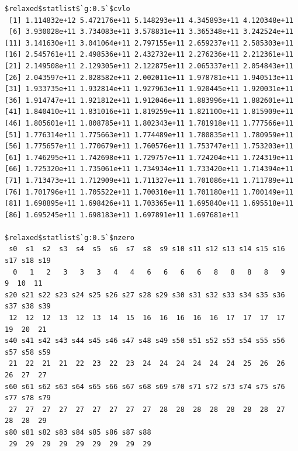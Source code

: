 \documentclass[
]{article}
\begin{document}
\begin{verbatim}
$relaxed$statlist$`g:0.5`$cvlo
 [1] 1.114832e+12 5.472176e+11 5.148293e+11 4.345893e+11 4.120348e+11
 [6] 3.930028e+11 3.734083e+11 3.578831e+11 3.365348e+11 3.242524e+11
[11] 3.141630e+11 3.041064e+11 2.797155e+11 2.659237e+11 2.585303e+11
[16] 2.545761e+11 2.498536e+11 2.432732e+11 2.276236e+11 2.212361e+11
[21] 2.149508e+11 2.129305e+11 2.122875e+11 2.065337e+11 2.054843e+11
[26] 2.043597e+11 2.028582e+11 2.002011e+11 1.978781e+11 1.940513e+11
[31] 1.933735e+11 1.932814e+11 1.927963e+11 1.920445e+11 1.920031e+11
[36] 1.914747e+11 1.921812e+11 1.912046e+11 1.883996e+11 1.882601e+11
[41] 1.840410e+11 1.831016e+11 1.819259e+11 1.821100e+11 1.815909e+11
[46] 1.805601e+11 1.808785e+11 1.802343e+11 1.781918e+11 1.777566e+11
[51] 1.776314e+11 1.775663e+11 1.774489e+11 1.780835e+11 1.780959e+11
[56] 1.775657e+11 1.770679e+11 1.760576e+11 1.753747e+11 1.753203e+11
[61] 1.746295e+11 1.742698e+11 1.729757e+11 1.724204e+11 1.724319e+11
[66] 1.725320e+11 1.735061e+11 1.734934e+11 1.733420e+11 1.714394e+11
[71] 1.713473e+11 1.712909e+11 1.711327e+11 1.701086e+11 1.711789e+11
[76] 1.701796e+11 1.705522e+11 1.700310e+11 1.701180e+11 1.700149e+11
[81] 1.698895e+11 1.698426e+11 1.703365e+11 1.695840e+11 1.695518e+11
[86] 1.695245e+11 1.698183e+11 1.697891e+11 1.697681e+11

$relaxed$statlist$`g:0.5`$nzero
 s0  s1  s2  s3  s4  s5  s6  s7  s8  s9 s10 s11 s12 s13 s14 s15 s16 s17 s18 s19 
  0   1   2   3   3   3   4   4   6   6   6   6   8   8   8   8   9   9  10  11 
s20 s21 s22 s23 s24 s25 s26 s27 s28 s29 s30 s31 s32 s33 s34 s35 s36 s37 s38 s39 
 12  12  12  13  12  13  14  15  16  16  16  16  16  17  17  17  17  19  20  21 
s40 s41 s42 s43 s44 s45 s46 s47 s48 s49 s50 s51 s52 s53 s54 s55 s56 s57 s58 s59 
 21  22  21  21  22  23  22  23  24  24  24  24  24  24  25  26  26  26  27  27 
s60 s61 s62 s63 s64 s65 s66 s67 s68 s69 s70 s71 s72 s73 s74 s75 s76 s77 s78 s79 
 27  27  27  27  27  27  27  27  27  28  28  28  28  28  28  28  27  28  28  29 
s80 s81 s82 s83 s84 s85 s86 s87 s88 
 29  29  29  29  29  29  29  29  29 



\end{verbatim}
\end{document}
